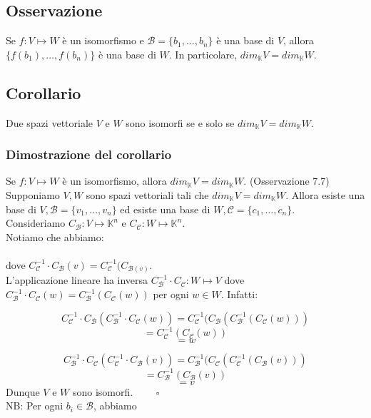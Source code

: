 \documentclass[12pt]{article}
\begin{document}
\subsection{Osservazione}

Se $f: V \mapsto W$ è un isomorfismo e $\mathcal{B} = \{b_1, \dots, b_n\}$ è una base di $V$, allora $\{f(b_1), \dots, f(b_n)\}$ è una base di $W$. In particolare, $dim_{\mathbb{K}}V = dim_{\mathbb{K}}W$.

\subsection{Corollario}

Due spazi vettoriale $V$ e $W$ sono isomorfi se e solo se  $dim_{\mathbb{K}}V = dim_{\mathbb{K}}W$.

\subsubsection{Dimostrazione del corollario}

Se $f: V \mapsto W$ è un isomorfismo, allora $dim_{\mathbb{K}}V = dim_{\mathbb{K}}W$. (Osservazione 7.7)\\
Supponiamo $V, W$ sono spazi vettoriali tali che $dim_{\mathbb{K}}V = dim_{\mathbb{K}}W$. Allora esiste una base di $V, \mathcal{B} = \{v_1, \dots, v_n\} $ ed esiste una base di $W, \mathcal{C} = \{c_1, \dots, c_n\}$.\\
Consideriamo $C_{\mathcal{B}}: V \mapsto \mathbb{K}^n$ e $C_{\mathcal{C}}: W \mapsto \mathbb{K}^n$. \\
Notiamo che abbiamo:
\\\\
dove $C_{\mathcal{C}}^{-1} \cdot C_{\mathcal{B}}(v) = C_{\mathcal{C}}^{-1}(C_{\mathcal{B}(v)}$.\\
L'applicazione lineare ha inversa $C_{\mathcal{B}}^{-1} \cdot C_{\mathcal{C}}: W \mapsto V$ dove $C_{\mathcal{B}}^{-1} \cdot C_{\mathcal{C}}(w) = C_{\mathcal{B}}^{-1}(C_{\mathcal{C}}(w))$ per ogni $w \in W$. Infatti:

\[C_{\mathcal{C}}^{-1} \cdot C_{\mathcal{B}}(C_{\mathcal{B}}^{-1} \cdot C_{\mathcal{C}}(w)) = C_{\mathcal{C}}^{-1}(C_{\mathcal{B}}(C_{\mathcal{B}}^{-1}(C_{\mathcal{C}}(w)))\]
\[= C_{\mathcal{C}}^{-1}(C_{\mathcal{C}}(w))\]
\[= w\]

\[C_{\mathcal{B}}^{-1} \cdot C_{\mathcal{C}}(C_{\mathcal{C}}^{-1} \cdot C_{\mathcal{B}}(v)) = C_{\mathcal{B}}^{-1}(C_{\mathcal{C}}(C_{\mathcal{C}}^{-1}(C_{\mathcal{B}}(v)))\]
\[= C_{\mathcal{B}}^{-1}(C_{\mathcal{B}}(v))\]
\[= v\]
Dunque $V$ e $W$ sono isomorfi. $\quad \quad \square$
\\
NB: Per ogni $b_i \in \mathcal{B}$, abbiamo
\end{document}
